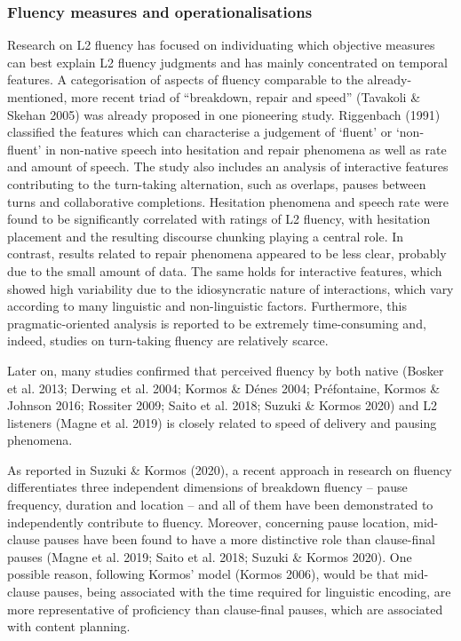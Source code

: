\subsubsection{Fluency measures and operationalisations}
\hypertarget{Toc191305927}{}\begin{styleStandard}
Research on L2 fluency has focused on individuating which objective measures can best explain L2 fluency judgments and has mainly concentrated on temporal features. A categorisation of aspects of fluency comparable to the already-mentioned, more recent triad of “breakdown, repair and speed” (Tavakoli \& Skehan 2005) was already proposed in one pioneering study. Riggenbach (1991) classified the features which can characterise a judgement of ‘fluent’ or ‘non-fluent’ in non-native speech into hesitation and repair phenomena as well as rate and amount of speech. The study also includes an analysis of interactive features contributing to the turn-taking alternation, such as overlaps, pauses between turns and collaborative completions. Hesitation phenomena and speech rate were found to be significantly correlated with ratings of L2 fluency, with hesitation placement and the resulting discourse chunking playing a central role. In contrast, results related to repair phenomena appeared to be less clear, probably due to the small amount of data. The same holds for interactive features, which showed high variability due to the idiosyncratic nature of interactions, which vary according to many linguistic and non-linguistic factors. Furthermore, this pragmatic-oriented analysis is reported to be extremely time-consuming and, indeed, studies on turn-taking fluency are relatively scarce.
\end{styleStandard}

\begin{styleStandard}
Later on, many studies confirmed that perceived fluency by both native (Bosker et al. 2013; Derwing et al. 2004; Kormos \& Dénes 2004; Préfontaine, Kormos \& Johnson 2016; Rossiter 2009; Saito et al. 2018; Suzuki \& Kormos 2020) and L2 listeners (Magne et al. 2019) is closely related to speed of delivery and pausing phenomena.
\end{styleStandard}

\begin{styleStandard}
As reported in Suzuki \& Kormos (2020), a recent approach in research on fluency differentiates three independent dimensions of breakdown fluency – pause frequency, duration and location – and all of them have been demonstrated to independently contribute to fluency. Moreover, concerning pause location, mid-clause pauses have been found to have a more distinctive role than clause-final pauses (Magne et al. 2019; Saito et al. 2018; Suzuki \& Kormos 2020). One possible reason, following Kormos’ model (Kormos 2006), would be that mid-clause pauses, being associated with the time required for linguistic encoding, are more representative of proficiency than clause-final pauses, which are associated with content planning.
\end{styleStandard}

